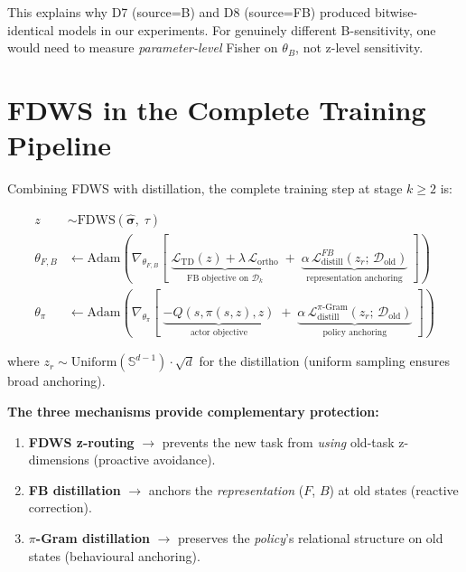 \documentclass[11pt]{article}
\newcommand{\loss}{\mathcal{L}}
\newcommand{\D}{\mathcal{D}}
\newcommand{\Sphere}{\mathbb{S}}
\begin{document}
This explains why D7 (source=B) and D8 (source=FB) produced bitwise-identical models in our experiments. For genuinely different B-sensitivity, one would need to measure \emph{parameter-level} Fisher on $\theta_B$, not z-level sensitivity.

\section{FDWS in the Complete Training Pipeline}

Combining FDWS with distillation, the complete training step at stage $k \geq 2$ is:

\begin{align}
    z &\sim \text{FDWS}(\hat{\bm{\sigma}},\;\tau) \tag{z-routing}\\[4pt]
    \theta_{F,B} &\leftarrow \text{Adam}\!\left(\nabla_{\theta_{F,B}}\left[\;
        \underbrace{\loss_{\text{TD}}(z) + \lambda\,\loss_{\text{ortho}}}_{\text{FB objective on }\D_k}
        \;+\; \underbrace{\alpha\,\loss_{\text{distill}}^{FB}(z_r;\,\D_{\text{old}})}_{\text{representation anchoring}}
    \;\right]\right) \tag{FB step}\\[4pt]
    \theta_\pi &\leftarrow \text{Adam}\!\left(\nabla_{\theta_\pi}\left[\;
        \underbrace{-Q(s,\pi(s,z),z)}_{\text{actor objective}}
        \;+\; \underbrace{\alpha\,\loss_{\text{distill}}^{\pi\text{-Gram}}(z_r;\,\D_{\text{old}})}_{\text{policy anchoring}}
    \;\right]\right) \tag{actor step}
\end{align}

where $z_r \sim \text{Uniform}(\Sphere^{d-1}) \cdot \sqrt{d}$ for the distillation (uniform sampling ensures broad anchoring).

\textbf{The three mechanisms provide complementary protection:}
\begin{enumerate}[nosep]
    \item \textbf{FDWS z-routing} $\to$ prevents the new task from \emph{using} old-task z-dimensions (proactive avoidance).
    \item \textbf{FB distillation} $\to$ anchors the \emph{representation} ($F$, $B$) at old states (reactive correction).
    \item \textbf{$\pi$-Gram distillation} $\to$ preserves the \emph{policy}'s relational structure on old states (behavioural anchoring).
\end{enumerate}
\end{document}
